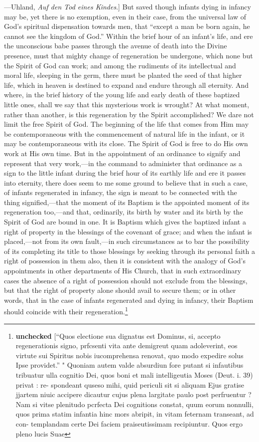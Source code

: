 \documentclass[]{book}
\begin{document}
{  ---Uhland, \emph{Auf den Tod eines Kindes}.{]}} But saved though infants dying in infancy may be, yet there is no exemption, even in their case, from the universal law of God's spiritual dispensation towards men, that ``except a man be born again, he cannot see the kingdom of God.'' Within the brief hour of an infant's life, and ere the unconscious babe passes through the avenue of death into the Divine presence, must that mighty change of regeneration be undergone, which none but the Spirit of God can work; and among the rudiments of its intellectual and moral life, sleeping in the germ, there must be planted the seed of that higher life, which in heaven is destined to expand and endure through all eternity. And where, in the brief history of the young life and early death of these baptized little ones, shall we say that this mysterious work is wrought? At what moment, rather than another, is this regeneration by the Spirit accomplished? We dare not limit the free Spirit of God. The beginning of the life that comes from Him may be contemporaneous with the commencement of natural life in the infant, or it may be contemporaneous with its close. The Spirit of God is free to do His own work at His own time. But in the appointment of an ordinance to signify and represent that very work,---in the command to administer that ordinance as a sign to the little infant during the brief hour of its earthly life and ere it passes into eternity, there does seem to me some ground to believe that in such a case, of infants regenerated in infancy, the sign is meant to be connected with the thing signified,---that the moment of its Baptism is the appointed moment of its regeneration too,---and that, ordinarily, its birth by water and its birth by the Spirit of God are bound in one. It is Baptism which gives the baptized infant a right of property in the blessings of the covenant of grace; and when the infant is placed,---not from its own fault,---in such circumstances as to bar the possibility of its completing its title to those blessings by seeking through its personal faith a right of possession in them also, then it is consistent with the analogy of God's appointments in other departments of His Church, that in such extraordinary cases the absence of a right of possession should not exclude from the blessings, but that the right of property alone should avail to secure them; or in other words, that in the case of infants regenerated and dying in infancy, their Baptism should coincide with their regeneration.\footnote{\textbf{unchecked} {[}``Quos electione sua dignatus est Dominus, si, accepto regenerationis signo, prfcsenti vita ante demigreut quam adoleverint, eos virtute sui Spiritus nobis iucomprehensa renovat, quo modo expedire solus Ipse providet.'' " Quoniam autem valde absurdiun fore putant si infautibus tribuatur ulla cognitio Dei, quos boni et mali intelligeutia Moses (Deut. i. 39) privat : re- spondeant quseso mihi, quid periculi sit si aliquam Ejus gratise jjartem niuic accipere dicautur cujus plena largitate paulo post perfruentur ? Nam si vitse plenitudo pcrfecta Dei cognitions constat, quum eorum nonnulli, quos prima statim infantia hinc mors abripit, in vitam feternam transeant, ad con- templandam certe Dei faciem praiseutissimam recipiuntur. Quos ergo pleno lucis Suae }
\end{document}
